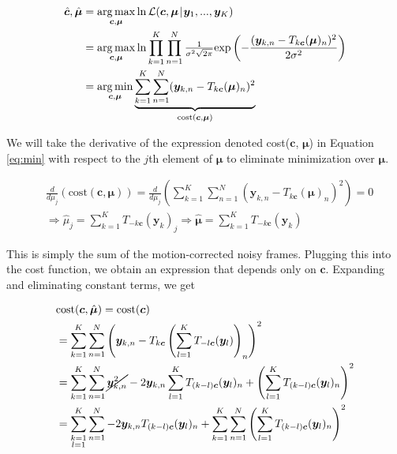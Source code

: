 \documentclass{article}
\newcommand\lpipe{\mkern1.5mu{|}\mkern1.5mu}
\DeclareMathOperator*{\argmin}{\arg\min}
\DeclareMathOperator*{\argmax}{\arg\max}
\begin{document}
\begin{align}
  \hat{\bm{c}}, \hat{\bm{\mu}} &= \argmax_{\bm{c}, \bm{\mu}} \ln \mathcal{L}(\bm{c}, \bm{\mu} \lpipe \bm{y}_1, ..., \bm{y}_K) \nonumber \\
  &=\argmax_{\bm{c}, \bm{\mu}} \ln \prod_{k=1}^K \prod_{n=1}^N \tfrac{1}{\sigma^2 \sqrt{2 \pi}} \text{exp} \left(- \frac{(\bm{y}_{k,n} - T_{k\bm{c}}(\bm{\mu})_n)^2}{2\sigma^2}\right) \nonumber \\
  &=\argmin_{\bm{c}, \bm{\mu}} \underbrace{\sum_{k=1}^K \sum_{n=1}^N (\bm{y}_{k,n} - T_{k\bm{c}}(\bm{\mu})_n)^2}_{\text{cost}(\bm{c}, \bm{\mu})} \label{eq:min}
\end{align}

We will take the derivative of the expression denoted cost($\bm{c}$, $\bm{\mu}$) in Equation \ref{eq:min} with respect to the $j$th element of $\bm{\mu}$ to eliminate minimization over $\bm{\mu}$.


\begin{align}
  &\frac{d}{d\mu_j}\left(\text{cost}(\bm{c}, \bm{\mu})\right)
  =\frac{d}{d\mu_j}\left(\sum_{k=1}^K \sum_{n=1}^N (\bm{y}_{k,n} - T_{k\bm{c}}(\bm{\mu})_n)^2\right) = 0 \nonumber  \\
  &\Longrightarrow \hat{\mu}_j = \sum_{k=1}^K T_{-k\bm{c}}(\bm{y}_k)_j
  \Longrightarrow \hat{\bm{\mu}} = \sum_{k=1}^K T_{-k\bm{c}}(\bm{y}_k) \label{eq:mu}
\end{align}

This is simply the sum of the motion-corrected noisy frames.  Plugging this into the cost function, we obtain an expression that depends only on $\bm{c}$.  Expanding and eliminating constant terms, we get

\begin{align*}
  &\text{cost}(\bm{c}, \hat{\bm{\mu}}) = \text{cost}(\bm{c}) \\
  &=\sum_{k=1}^K \sum_{n=1}^N \left(\bm{y}_{k,n} - T_{k\bm{c}}\left(\sum_{l=1}^K T_{-l\bm{c}}(\bm{y}_l)\right)_n\right)^2 \\
  &=\sum_{k=1}^K \sum_{n=1}^N \cancel{\bm{y}_{k,n}^2} -2\bm{y}_{k,n}\sum_{l=1}^K T_{(k-l)\bm{c}}(\bm{y}_l)_n + \left(\sum_{l=1}^K T_{(k-l)\bm{c}}(\bm{y}_l)_n\right)^2 \\
  &=\sum_{\substack{k=1 \\ l=1}}^K \sum_{n=1}^N -2\bm{y}_{k,n} T_{(k-l)\bm{c}}(\bm{y}_l)_n +
  \sum_{k=1}^K \sum_{n=1}^N \left(\sum_{l=1}^K T_{(k-l)\bm{c}}(\bm{y}_l)_n\right)^2 \\
\end{align*}
\end{document}
